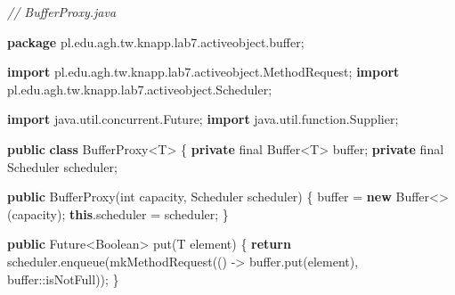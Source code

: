 \documentclass[11pt]{article}
\newenvironment{Shaded}{}{}
\newcommand{\KeywordTok}[1]{\textcolor[rgb]{0.00,0.44,0.13}{\textbf{{#1}}}}
\newcommand{\DataTypeTok}[1]{\textcolor[rgb]{0.56,0.13,0.00}{{#1}}}
\newcommand{\CommentTok}[1]{\textcolor[rgb]{0.38,0.63,0.69}{\textit{{#1}}}}
\newcommand{\FunctionTok}[1]{\textcolor[rgb]{0.02,0.16,0.49}{{#1}}}
\newcommand{\NormalTok}[1]{{#1}}
\newcommand{\ImportTok}[1]{{#1}}
\newcommand{\ControlFlowTok}[1]{\textcolor[rgb]{0.00,0.44,0.13}{\textbf{{#1}}}}
\newcommand{\OperatorTok}[1]{\textcolor[rgb]{0.40,0.40,0.40}{{#1}}}
\newcommand{\BuiltInTok}[1]{{#1}}
\begin{document}
\begin{Shaded}
\begin{Highlighting}[]
\CommentTok{// BufferProxy.java}

\KeywordTok{package}\ImportTok{ pl}\OperatorTok{.}\ImportTok{edu}\OperatorTok{.}\ImportTok{agh}\OperatorTok{.}\ImportTok{tw}\OperatorTok{.}\ImportTok{knapp}\OperatorTok{.}\ImportTok{lab7}\OperatorTok{.}\ImportTok{activeobject}\OperatorTok{.}\ImportTok{buffer}\OperatorTok{;}

\KeywordTok{import} \ImportTok{pl}\OperatorTok{.}\ImportTok{edu}\OperatorTok{.}\ImportTok{agh}\OperatorTok{.}\ImportTok{tw}\OperatorTok{.}\ImportTok{knapp}\OperatorTok{.}\ImportTok{lab7}\OperatorTok{.}\ImportTok{activeobject}\OperatorTok{.}\ImportTok{MethodRequest}\OperatorTok{;}
\KeywordTok{import} \ImportTok{pl}\OperatorTok{.}\ImportTok{edu}\OperatorTok{.}\ImportTok{agh}\OperatorTok{.}\ImportTok{tw}\OperatorTok{.}\ImportTok{knapp}\OperatorTok{.}\ImportTok{lab7}\OperatorTok{.}\ImportTok{activeobject}\OperatorTok{.}\ImportTok{Scheduler}\OperatorTok{;}

\KeywordTok{import} \ImportTok{java}\OperatorTok{.}\ImportTok{util}\OperatorTok{.}\ImportTok{concurrent}\OperatorTok{.}\ImportTok{Future}\OperatorTok{;}
\KeywordTok{import} \ImportTok{java}\OperatorTok{.}\ImportTok{util}\OperatorTok{.}\ImportTok{function}\OperatorTok{.}\ImportTok{Supplier}\OperatorTok{;}

\KeywordTok{public} \KeywordTok{class}\NormalTok{ BufferProxy}\OperatorTok{\textless{}}\NormalTok{T}\OperatorTok{\textgreater{}} \OperatorTok{\{}
    \KeywordTok{private} \DataTypeTok{final} \BuiltInTok{Buffer}\OperatorTok{\textless{}}\NormalTok{T}\OperatorTok{\textgreater{}}\NormalTok{ buffer}\OperatorTok{;}
    \KeywordTok{private} \DataTypeTok{final}\NormalTok{ Scheduler scheduler}\OperatorTok{;}

    \KeywordTok{public} \FunctionTok{BufferProxy}\OperatorTok{(}\DataTypeTok{int}\NormalTok{ capacity}\OperatorTok{,}\NormalTok{ Scheduler scheduler}\OperatorTok{)} \OperatorTok{\{}
\NormalTok{        buffer }\OperatorTok{=} \KeywordTok{new} \BuiltInTok{Buffer}\OperatorTok{\textless{}\textgreater{}(}\NormalTok{capacity}\OperatorTok{);}
        \KeywordTok{this}\OperatorTok{.}\FunctionTok{scheduler} \OperatorTok{=}\NormalTok{ scheduler}\OperatorTok{;}
    \OperatorTok{\}}

    \KeywordTok{public} \BuiltInTok{Future}\OperatorTok{\textless{}}\BuiltInTok{Boolean}\OperatorTok{\textgreater{}} \FunctionTok{put}\OperatorTok{(}\NormalTok{T element}\OperatorTok{)} \OperatorTok{\{}
        \ControlFlowTok{return}\NormalTok{ scheduler}\OperatorTok{.}\FunctionTok{enqueue}\OperatorTok{(}\FunctionTok{mkMethodRequest}\OperatorTok{(()} \OperatorTok{{-}\textgreater{}}
\NormalTok{            buffer}\OperatorTok{.}\FunctionTok{put}\OperatorTok{(}\NormalTok{element}\OperatorTok{),}\NormalTok{ buffer}\OperatorTok{::}\NormalTok{isNotFull}\OperatorTok{));}
    \OperatorTok{\}}


\end{Highlighting}
\end{Shaded}
\end{document}
